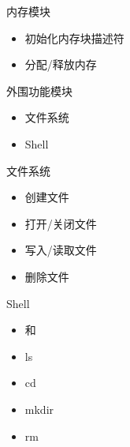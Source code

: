 \documentclass{swfubeamer}
\begin{document}
\begin{frame}{内存模块}
  \begin{itemize}
  \item 初始化内存块描述符
  \item 分配/释放内存
  \end{itemize}
\end{frame}

\begin{frame}{外围功能模块}
  \begin{itemize}
  \item 文件系统
  \item Shell
  \end{itemize}
\end{frame}

\begin{frame}{文件系统}
  \begin{itemize}
  \item 创建文件
  \item 打开/关闭文件
  \item 写入/读取文件
  \item 删除文件
  \end{itemize}
\end{frame}

\begin{frame}{Shell}
  \begin{itemize}
  \item {} 和 
  \item ls
  \item cd
  \item mkdir
  \item rm
  \end{itemize}
\end{frame}
\end{document}
